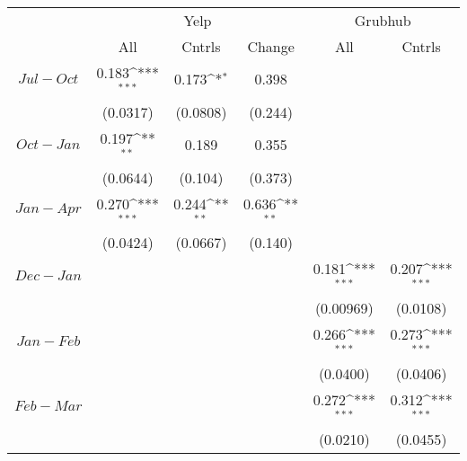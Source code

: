 {
\def\sym#1{\ifmmode^{#1}\else\(^{#1}\)\fi}
\begin{tabular}{c*{5}{c}}
\hline\hline
					& \multicolumn{3}{c}{Yelp} & \multicolumn{2}{c}{Grubhub} \\ \cline{2-4} \cline{5-6}
                    &        All         &      Cntrls         &      Change         &        All         &        Cntrls        \\
\hline
 $ Jul-Oct $        &       0.183\sym{***}&       0.173\sym{*}  &       0.398         &                     &                     \\
                    &    (0.0317)         &    (0.0808)         &     (0.244)         &                     &                     \\
[1em]
 $ Oct-Jan $        &       0.197\sym{**} &       0.189         &       0.355         &                     &                     \\
                    &    (0.0644)         &     (0.104)         &     (0.373)         &                     &                     \\
[1em]
 $ Jan-Apr $        &       0.270\sym{***}&       0.244\sym{**} &       0.636\sym{**} &                     &                     \\
                    &    (0.0424)         &    (0.0667)         &     (0.140)         &                     &                     \\
[1em]
 $ Dec-Jan $        &                     &                     &                     &       0.181\sym{***}&       0.207\sym{***}\\
                    &                     &                     &                     &   (0.00969)         &    (0.0108)         \\
[1em]
 $ Jan-Feb $        &                     &                     &                     &       0.266\sym{***}&       0.273\sym{***}\\
                    &                     &                     &                     &    (0.0400)         &    (0.0406)         \\
[1em]
 $ Feb-Mar $        &                     &                     &                     &       0.272\sym{***}&       0.312\sym{***}\\
                    &                     &                     &                     &    (0.0210)         &    (0.0455)         \\

\end{tabular}}
